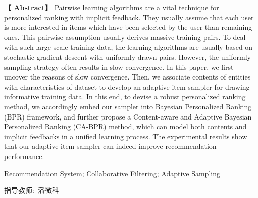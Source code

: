 \newpage

\centerline{\fangsong\bf{}}


\vskip 20bp

\hspace{4bp} {\textbf{【 Abstract】}} 
Pairwise learning algorithms are a vital technique
for personalized ranking with implicit feedback. They usually
assume that each user is more interested in items which have
been selected by the user than remaining ones. This pairwise
assumption usually derives massive training pairs. To deal with
such large-scale training data, the learning algorithms are usually
based on stochastic gradient descent with uniformly drawn pairs.
However, the uniformly sampling strategy often results in slow
convergence. In this paper, we first uncover the reasons of
slow convergence. Then, we associate contents of entities with
characteristics of dataset to develop an adaptive item sampler
for drawing informative training data. In this end, to devise a
robust personalized ranking method, we accordingly embed our
sampler into Bayesian Personalized Ranking (BPR) framework,
and further propose a Content-aware and Adaptive Bayesian
Personalized Ranking (CA-BPR) method, which can model both
contents and implicit feedbacks in a unified learning process. The
experimental results show that our adaptive item sampler can indeed improve recommendation performance.

\vskip 10bp

Recommendation System; Collaborative Filtering; Adaptive Sampling


\vskip 20bp

\begin{flushright}
    \kaishu 指导教师:\ 潘微科 \hspace{3cm}{ }
\end{flushright}

\label{lastpage}%
